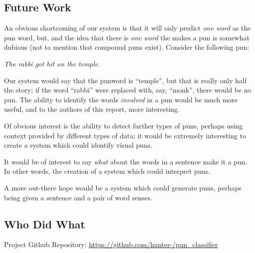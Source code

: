 \documentclass{article}
\begin{document}
\subsection{Future Work}

An obvious shortcoming of our system is that it will only predict \emph{one
word} as the pun word, but, and the idea that there is \emph{one word} the makes
a pun is somewhat dubious (not to mention that compound puns exist). Consider
the following pun: 
\begin{center}
	\emph{The rabbi got hit on the temple.}
\end{center}
Our system would say that the punword is ``temple'', but that is really only half
the story; if the word ``rabbi'' were replaced with, say, ``monk'', there would
be no pun. The ability to identify the words \emph{involved} in a pun would be
much more useful, and to the authors of this report, more interesting.

Of obvious interest is the ability to detect further types of puns, perhaps
using context provided by different types of data; it would be extremely
interesting to create a system which could identify visual puns. 

It would be of interest to say \emph{what} about the words in a sentence make it
a pun. In other words, the creation of a system which could interpret puns.

A more out-there hope would be a system which could generate puns, perhaps being
given a sentence and a pair of word senses.

\subsection{Who Did What}

Project Github Repository: \url{https://github.com/hunter-/pun_classifier}
\end{document}
